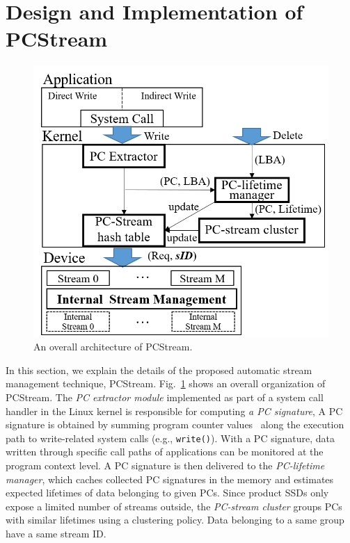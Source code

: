 \section{Design and Implementation of \textsf{PCStream}}

\begin{figure}[t]
	\centering
	\includegraphics[width=0.8\linewidth]{figure/overview.png}
	\caption{An overall architecture of \textsf{\small PCStream}.}
	\label{fig:architecture}
\end{figure}

In this section, we explain the details of the proposed automatic stream
management technique, \textsf{\small PCStream}.
Fig.~\ref{fig:architecture} shows an overall organization of \textsf{\small
PCStream}. The \textit{PC extractor module} implemented as part of a system
call handler in the Linux kernel is responsible for computing \textit{a PC
signature},  A PC
signature is obtained by summing program counter values~\cite{PC} along the
execution path to write-related system calls (e.g., {\tt write()}).  With a PC
signature, data written through specific call paths of applications can be
monitored at the program context level.  A PC signature is then delivered to
the \textit{PC-lifetime manager}, which caches collected PC signatures in the
memory and estimates expected lifetimes of data belonging to given PCs.  Since
product SSDs only expose a limited number of streams outside, the
\textit{PC-stream cluster} groups PCs with similar lifetimes using a clustering 
policy. Data belonging to a same group have a same stream ID.

